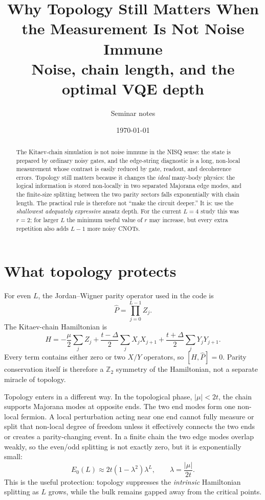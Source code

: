 \documentclass[11pt]{article}
\title{Why Topology Still Matters When the Measurement Is Not Noise Immune\\
\large Noise, chain length, and the optimal VQE depth}
\author{Seminar notes}
\date{\today}
\newcommand{\Pop}{\hat{P}}
\begin{document}
\maketitle

\begin{abstract}
The Kitaev-chain simulation is not noise immune in the NISQ sense: the state is
prepared by ordinary noisy gates, and the edge-string diagnostic is a long,
non-local measurement whose contrast is easily reduced by gate, readout, and
decoherence errors. Topology still matters because it changes the \emph{ideal}
many-body physics: the logical information is stored non-locally in two separated
Majorana edge modes, and the finite-size splitting between the two parity sectors
falls exponentially with chain length. The practical rule is therefore not
``make the circuit deeper.'' It is: use the \emph{shallowest adequately expressive}
ansatz depth. For the current $L=4$ study this was $r=2$; for larger $L$ the
minimum useful value of $r$ may increase, but every extra repetition also adds
$L-1$ more noisy CNOTs.
\end{abstract}

\section{What topology protects}

For even $L$, the Jordan--Wigner parity operator used in the code is
\begin{equation}
  \Pop=\prod_{j=0}^{L-1}Z_j .
\end{equation}
The Kitaev-chain Hamiltonian is
\begin{equation}
  H =
  -\frac{\mu}{2}\sum_j Z_j
  +\frac{t-\Delta}{2}\sum_j X_jX_{j+1}
  +\frac{t+\Delta}{2}\sum_j Y_jY_{j+1}.
\end{equation}
Every term contains either zero or two $X/Y$ operators, so $[H,\Pop]=0$. Parity
conservation itself is therefore a $\mathbb{Z}_2$ symmetry of the Hamiltonian,
not a separate miracle of topology.

Topology enters in a different way. In the topological phase, $|\mu|<2t$, the
chain supports Majorana modes at opposite ends. The two end modes form one
non-local fermion. A local perturbation acting near one end cannot fully measure
or split that non-local degree of freedom unless it effectively connects the two
ends or creates a parity-changing event. In a finite chain the two edge modes
overlap weakly, so the even/odd splitting is not exactly zero, but it is
exponentially small:
\begin{equation}
  E_0(L)
  \approx
  2t(1-\lambda^2)\lambda^L,
  \qquad
  \lambda=\frac{|\mu|}{2t}.
\end{equation}
This is the useful protection: topology suppresses the \emph{intrinsic}
Hamiltonian splitting as $L$ grows, while the bulk remains gapped away from the
critical points.
\end{document}
